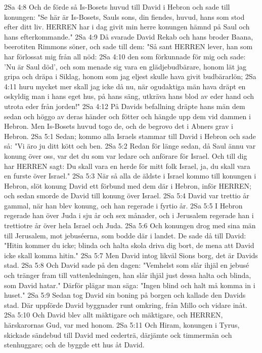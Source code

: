 2Sa 4:8  Och de förde så Is-Bosets huvud till David i Hebron och sade till konungen: "Se här är Is-Bosets, Sauls sons, din fiendes, huvud, hans som stod efter ditt liv. HERREN har i dag givit min herre konungen hämnd på Saul och hans efterkommande."
2Sa 4:9  Då svarade David Rekab och hans broder Baana, beerotiten Rimmons söner, och sade till dem: "Så sant HERREN lever, han som har förlossat mig från all nöd:
2Sa 4:10  den som förkunnade för mig och sade: 'Nu är Saul död', och som menade sig vara en glädjebudbärare, honom lät jag gripa och dräpa i Siklag, honom som jag eljest skulle hava givit budbärarlön;
2Sa 4:11  huru mycket mer skall jag icke då nu, när ogudaktiga män hava dräpt en oskyldig man i hans eget hus, på hans säng, utkräva hans blod av eder hand och utrota eder från jorden!"
2Sa 4:12  På Davids befallning dräpte hans män dem sedan och höggo av deras händer och fötter och hängde upp dem vid dammen i Hebron. Men Is-Bosets huvud togo de, och de begrovo det i Abners grav i Hebron.
2Sa 5:1  Sedan; kommo alla Israels stammar till David i Hebron och sade så: "Vi äro ju ditt kött och ben.
2Sa 5:2  Redan för länge sedan, då Saul ännu var konung över oss, var det du som var ledare och anförare för Israel. Och till dig har HERREN sagt: Du skall vara en herde för mitt folk Israel, ja, du skall vara en furste över Israel."
2Sa 5:3  När så alla de äldste i Israel kommo till konungen i Hebron, slöt konung David ett förbund med dem där i Hebron, inför HERREN; och sedan smorde de David till konung över Israel.
2Sa 5:4  David var trettio år gammal, när han blev konung, och han regerade i fyrtio år.
2Sa 5:5  I Hebron regerade han över Juda i sju år och sex månader, och i Jerusalem regerade han i trettiotre år över hela Israel och Juda.
2Sa 5:6  Och konungen drog med sina män till Jerusalem, mot jebuséerna, som bodde där i landet. De sade då till David: "Hitin kommer du icke; blinda och halta skola driva dig bort, de mena att David icke skall komma hitin."
2Sa 5:7  Men David intog likväl Sions borg, det är Davids stad.
2Sa 5:8  Och David sade på den dagen: "Vemhelst som slår ihjäl en jebusé och tränger fram till vattenledningen, han slår ihjäl just dessa halta och blinda, som David hatar." Därför plägar man säga: "Ingen blind och halt må komma in i huset."
2Sa 5:9  Sedan tog David sin boning på borgen och kallade den Davids stad. Där uppförde David byggnader runt omkring, från Millo och vidare inåt.
2Sa 5:10  Och David blev allt mäktigare och mäktigare, och HERREN, härskarornas Gud, var med honom.
2Sa 5:11  Och Hiram, konungen i Tyrus, skickade sändebud till David med cederträ, därjämte ock timmermän och stenhuggare; och de byggde ett hus åt David.
